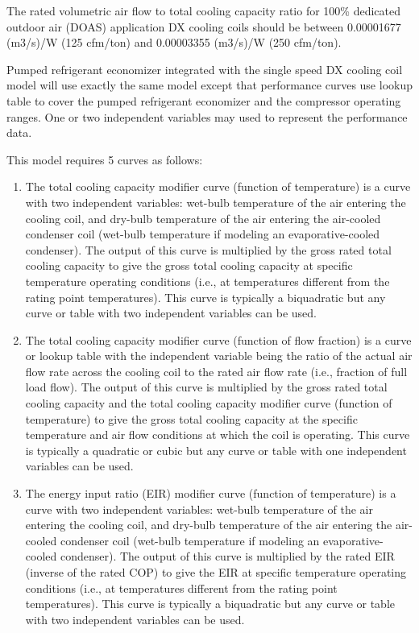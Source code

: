 The rated volumetric air flow to total cooling capacity ratio for 100\% dedicated outdoor air (DOAS) application DX cooling coils should be between 0.00001677 (m3/s)/W (125 cfm/ton) and 0.00003355 (m3/s)/W (250 cfm/ton).

Pumped refrigerant economizer integrated with the single speed DX cooling coil model will use exactly the same model except that performance curves use lookup table to cover the pumped refrigerant economizer and the compressor operating ranges. One or two independent variables may used to represent the performance data.

This model requires 5 curves as follows:

\begin{enumerate}
\def\labelenumi{\arabic{enumi}.}
\item
  The total cooling capacity modifier curve (function of temperature) is a curve with two independent variables: wet-bulb temperature of the air entering the cooling coil, and dry-bulb temperature of the air entering the air-cooled condenser coil (wet-bulb temperature if modeling an evaporative-cooled condenser). The output of this curve is multiplied by the gross rated total cooling capacity to give the gross total cooling capacity at specific temperature operating conditions (i.e., at temperatures different from the rating point temperatures). This curve is typically a biquadratic but any curve or table with two independent variables can be used.
\item
  The total cooling capacity modifier curve (function of flow fraction) is a curve or lookup table with the independent variable being the ratio of the actual air flow rate across the cooling coil to the rated air flow rate (i.e., fraction of full load flow). The output of this curve is multiplied by the gross rated total cooling capacity and the total cooling capacity modifier curve (function of temperature) to give the gross total cooling capacity at the specific temperature and air flow conditions at which the coil is operating. This curve is typically a quadratic or cubic but any curve or table with one independent variables can be used.
\item
  The energy input ratio (EIR) modifier curve (function of temperature) is a curve with two independent variables: wet-bulb temperature of the air entering the cooling coil, and dry-bulb temperature of the air entering the air-cooled condenser coil (wet-bulb temperature if modeling an evaporative-cooled condenser). The output of this curve is multiplied by the rated EIR (inverse of the rated COP) to give the EIR at specific temperature operating conditions (i.e., at temperatures different from the rating point temperatures). This curve is typically a biquadratic but any curve or table with two independent variables can be used.

\end{enumerate}
